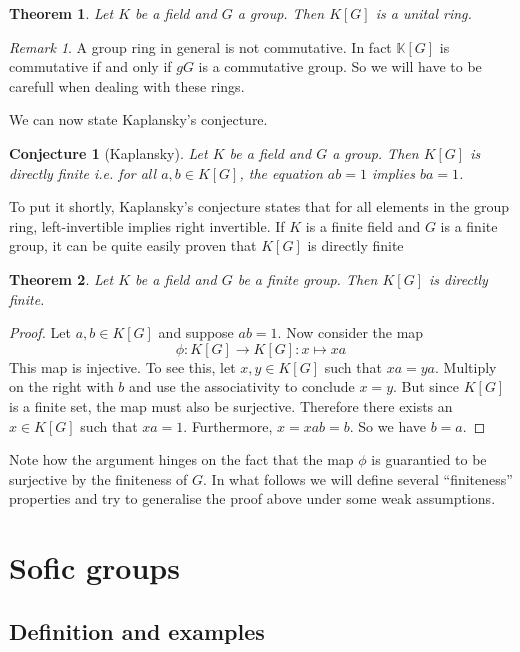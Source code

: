 \documentclass[titlepage, a4paper]{article}
\newtheorem{theorem}{Theorem}
\newtheorem{conjecture}{Conjecture}
\theoremstyle{remark}
\newtheorem{remark}{Remark}
\begin{document}
\begin{theorem}
    Let $K$ be a field and $G$ a group. Then $K[G]$ is a unital ring.
\end{theorem}

\begin{remark}
	A group ring in general is not commutative. In fact $\mathbb{K}[G]$ is commutative if and only if $gG$ is a commutative group. So we will have to be carefull when dealing with these rings. 
\end{remark}
We can now state Kaplansky's conjecture.

\begin{conjecture}[Kaplansky]
    Let $K$ be a field and $G$ a group. Then $K[G]$ is directly finite i.e. for all $a, b \in K[G]$, the equation $ab=1$ implies $ba=1$.
\end{conjecture}

To put it shortly, Kaplansky's conjecture states that for all elements in the group ring, left-invertible implies right invertible. If $K$ is a finite field and $G$ is a finite group, it can be quite easily proven that $K[G]$ is directly finite

\begin{theorem}
    Let $K$ be a field and $G$ be a finite group. Then $K[G]$ is directly finite.
\end{theorem}
\begin{proof}
    Let $a, b \in K[G]$ and suppose $ab=1$. Now consider the map
    \[
        \phi: K[G] \to K[G]: x \mapsto x a
    \]
    This map is injective. To see this, let $x, y \in K[G]$ such that $xa=ya$. Multiply on the right with $b$ and use the associativity to conclude $x=y$.
    But since $K[G]$ is a finite set, the map must also be surjective. Therefore there exists an $x \in K[G]$ such that $x a = 1$. Furthermore, $x = xab = b$. So we have $b=a$.
\end{proof}

Note how the argument hinges on the fact that the map $\phi$ is guarantied to be surjective by the finiteness of $G$. In what follows we will define several ``finiteness'' properties and try to generalise the proof above under some weak assumptions.

\section{Sofic groups}\label{sec:sofic_group}

\subsection{Definition and examples}
\end{document}
